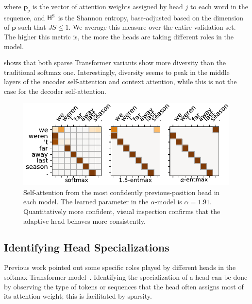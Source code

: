 where $\bm{p}_j$ is the vector of attention weights assigned by head
$j$ to each word in the sequence, and $\mathsf{H}^\textsc{S}$ is the Shannon entropy,
base-adjusted based on the dimension of $\bm{p}$ such that $JS \leq
    1$. We average this measure over the entire validation set. The
higher this metric is, the more the heads are taking different roles
in the model.

 shows that both sparse Transformer variants show
more diversity than the traditional softmax one. Interestingly,
diversity seems to peak in the middle layers of the encoder
self-attention and context attention, while this is not the case for
the decoder self-attention.

\begin{figure}[t]
    \centering
    \includegraphics[width=0.95\columnwidth]{Figures/head_prev.pdf}
    \caption{
        Self-attention from the most confidently previous-position head in
        each model. The learned parameter in the $\alpha$-\entmaxtext model
        is $\alpha=1.91$. Quantitatively more confident, visual inspection
        confirms that the adaptive head behaves more consistently.}
    \label{fig:head_prev}
\end{figure}

\subsection{Identifying Head Specializations}

Previous work pointed out some specific roles played by
different heads in the softmax Transformer
model~\citep{voita2018context,tang2018why,specialized}. Identifying
the specialization of a head can be done by observing the
type of tokens or sequences that the head often assigns most
of its attention weight; this is facilitated by sparsity.

